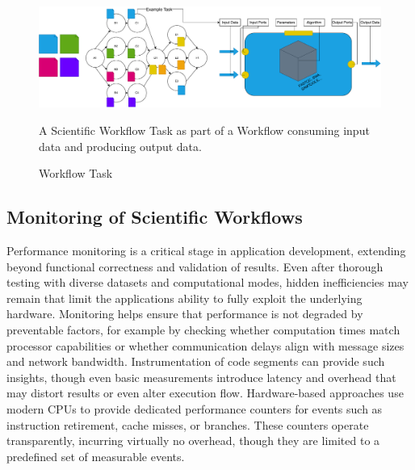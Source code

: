 \begin{figure}[H]
    \centering
    \includegraphics[scale=0.4]{fig/02/02-workflow-task.pdf}
    \caption{Workflow Task}
    \label{fig:02-workflow-task}
    \tiny
    A Scientific Workflow Task as part of a Workflow consuming input data and producing output data.
\end{figure}

\subsection{Monitoring of Scientific Workflows}
\label{sec:background_monitoring}
Performance monitoring is a critical stage in application development, extending beyond functional correctness and validation of results. Even after thorough testing with diverse datasets and computational modes, hidden inefficiencies may remain that limit the applications ability to fully exploit the underlying hardware. Monitoring helps ensure that performance is not degraded by preventable factors, for example by checking whether computation times match processor capabilities or whether communication delays align with message sizes and network bandwidth. Instrumentation of code segments can provide such insights, though even basic measurements introduce latency and overhead that may distort results or even alter execution flow. Hardware-based approaches use modern CPUs to provide dedicated performance counters for events such as instruction retirement, cache misses, or branches. These counters operate transparently, incurring virtually no overhead, though they are limited to a predefined set of measurable events.

